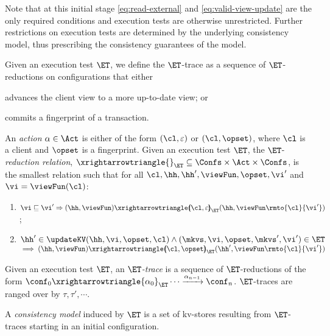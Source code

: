 Note that at this initial stage \eqref{eq:read-external} and \eqref{eq:valid-view-update} are the only required conditions and execution tests are otherwise unrestricted. 
Further restrictions on execution tests are determined by the underlying consistency model, thus prescribing the consistency guarantees of the model.

Given an execution test  $\ET$, we define the $\ET$-trace as a sequence of $\ET$-reductions on configurations that either 
\begin{enumerate*}
	\item advances the client view to a more up-to-date view; or 
	\item commits a fingerprint of a transaction. 
\end{enumerate*}

\begin{definition}[$\ET$-trace]
\label{def:reduction}
An \emph{action} $\alpha \in \Act$ is either of the form $(\cl, \varepsilon)$ or $(\cl, \opset)$, 
where $\cl$ is a client and $\opset$ is a fingerprint. 
Given an execution test $\ET$, the $\ET$-\emph{reduction relation},
$\xrightarrowtriangle{}_{\ET} \subseteq \Confs \times \Act \times \Confs$, 
is the smallest relation such that for all $\cl, \hh, \hh', \viewFun, \opset, \vi'$ and $\vi = \viewFun(\cl)$:
\begin{enumerate}
	\item
    $\vi \sqsubseteq \vi'
    \Rightarrow
    (\hh, \viewFun) \xrightarrowtriangle{\hspace{-5pt}(\cl, \varepsilon)\hspace{-5pt}}_{\ET} 
    (\hh, \viewFun\rmto{\cl}{\vi'})$; 
	\item 
    $\hh' \in \updateKV(\hh, \vi , \opset, \cl)
     \wedge (\mkvs, \vi, \opset, \mkvs', \vi') \in \ET
	$  \\
	\phantom{a} \hfill $\implies (\hh, \viewFun) \xrightarrowtriangle{\hspace{-5pt}(\cl, \opset)\hspace{-5pt}}_{\ET} (\hh', \viewFun\rmto{\cl}{\vi'})$
\end{enumerate}
Given an execution test $\ET$, an \emph{$\ET$-trace} is a sequence of $\ET$-reductions of the form $\conf_{0} \xrightarrowtriangle{\alpha_{0}}_{\ET} \cdots 
\xrightarrow{\alpha_{n-1}} \conf_{n}$. $\ET$-traces are ranged over by $\tau, \tau', \cdots$.
\end{definition}

A \emph{consistency model} induced by $\ET$ is a set of kv-stores
resulting from $\ET$-traces starting in an 
initial configuration. 

